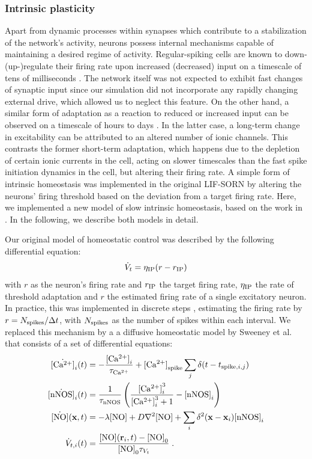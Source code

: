 \documentclass[10pt,letterpaper]{article}
\begin{document}
\subsubsection*{Intrinsic plasticity}
Apart from dynamic processes within synapses which contribute to a stabilization of the network's activity, neurons possess internal mechanisms capable of maintaining a desired regime of activity. Regular-spiking cells are known to down-(up-)regulate their firing rate upon increased (decreased) input on a timescale of tens of milliseconds \cite{Connors_Gutnick_Spike_Patterns,Benda_Herz_Spike_Frequ_Adaption}. The network itself was not expected to exhibit fast changes of synaptic input since our simulation did not incorporate any rapidly changing external drive, which allowed us to neglect this feature. On the other hand, a similar form of adaptation as a reaction to reduced or increased input can be observed on a timescale of hours to days \cite{Desai_IP}. In the latter case, a long-term change in excitability can be attributed to an altered number of ionic channels. This contrasts the former short-term adaptation, which happens due to the depletion of certain ionic currents in the cell, acting on slower timescales than the fast spike initiation dynamics in the cell, but altering their firing rate. A simple form of intrinsic homeostasis was implemented in the original LIF-SORN by altering the neurons' firing threshold based on the deviation from a target firing rate. Here, we implemented a new model of slow intrinsic homeostasis, based on the work in \cite{Sweeney_Paper}. In the following, we describe both models in detail.

Our original model of homeostatic control was described by the following differential equation:
\begin{equation}
\dot{V}_t = \eta_{\rm IP}(r-r_{\rm IP}) \label{can_hom_rate}
\end{equation}
with $r$ as the neuron's firing rate and $r_{\rm IP}$ the target firing rate, $\eta_{\rm IP}$ the rate of threshold adaptation and $r$ the estimated firing rate of a single excitatory neuron. In practice, this was implemented in discrete steps , estimating the firing rate by $r = N_{\rm spikes} / \Delta t$, with $N_{\rm spikes}$ as the number of spikes within each interval. We replaced this mechanism by a a diffusive homeostatic model by Sweeney et al. that consists of a set of differential equations:   
\begin{align}
\dot{{\rm [Ca^{2+}]}}_i(t) &= -\frac{{\rm [Ca^{2+}]}_i}{\tau_{\rm Ca^{2+}}} + {\rm [Ca^{2+}]}_{\rm spike} \sum_{j} \delta(t-t_{\mathrm{spike},i,j}) \label{Ca_dyn}\\
\dot{{\rm [nNOS]}}_i(t) &= \frac{1}{\tau_{\rm nNOS}} \left(\frac{{\rm [Ca^{2+}]}_i^3}{{\rm [Ca^{2+}]}_i^3+1} - {\rm [nNOS]}_i \right) \label{nNOS_dyn}\\
\dot{{\rm [NO]}}(\mathbf{x},t)&=-\lambda {\rm [NO]} + D \nabla^2 {\rm [NO]} + \sum_{i} \delta^2(\mathbf{x}-\mathbf{x}_i) {\rm [nNOS]}_i \label{NO_dyn}\\
\dot{V}_{t,i}(t) &= \frac{{\rm [NO]}(\mathbf{r}_{i},t)-{\rm [NO]}_0}{{\rm [NO]}_0 \tau_{V_t}} \; . \label{Theta_dyn}
\end{align}
\end{document}
